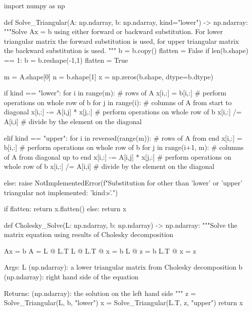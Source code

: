 \begin{python}
import numpy as np

def Solve_Triangular(A: np.ndarray, b: np.ndarray, kind="lower") -> np.ndarray:
    """Solve Ax = b using either forward or backward substitution. For lower
    triangular matrix the forward substitution is used, for upper triangular
    matrix the backward substitution is used.
    """
    b = b.copy()
    flatten = False
    if len(b.shape) == 1:
        b = b.reshape(-1,1)
        flatten = True

    m = A.shape[0]
    n = b.shape[1]
    x = np.zeros(b.shape, dtype=b.dtype)

    if kind == "lower":
        for i in range(m):                # rows of A
            x[i,:] = b[i,:]               # perform operations on whole row of b
            for j in range(i):            # columns of A from start to diagonal
                x[i,:] -= A[i,j] * x[j,:] # perform operations on whole row of b
            x[i,:] /= A[i,i]              # divide by the element on the diagonal

    elif kind == "upper":
        for i in reversed(range(m)):      # rows of A from end
            x[i,:] = b[i,:]               # perform operations on whole row of b
            for j in range(i+1, m):       # columns of A from diagonal up to end
                x[i,:] -= A[i,j] * x[j,:] # perform operations on whole row of b
            x[i,:] /= A[i,i]              # divide by the element on the diagonal

    else:
        raise NotImplementedError(f"Substitution for other than 'lower' or 'upper' triangular not implemented: '{kind:s}'.")

    if flatten:
        return x.flatten()
    else:
        return x


def Cholesky_Solve(L: np.ndarray, b: np.ndarray) -> np.ndarray:
    """Solve the matrix equation using results of Cholesky decomposition

        Ax = b
        A = L @ L.T
        L @ L.T @ x = b
        L @ z = b
        L.T @ x = z

    Args:
        L (np.ndarray): a lower triangular matrix from Cholesky decomposition
        b (np.ndarray): right hand side of the equation

    Returns:
        (np.ndarray): the solution on the left hand side
    """
    z = Solve_Triangular(L,   b, "lower")
    x = Solve_Triangular(L.T, z, "upper")
    return x

\end{python}


